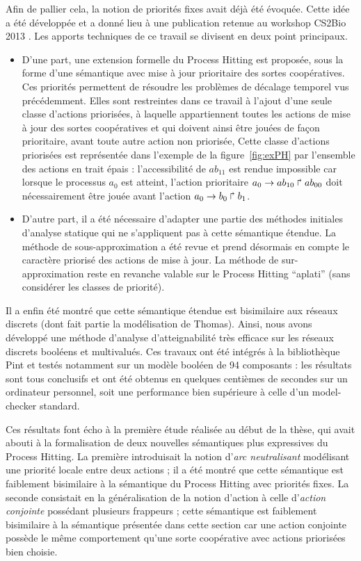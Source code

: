Afin de pallier cela, la notion de priorités fixes avait déjà été évoquée.
Cette idée a été développée et a donné lieu à une publication retenue au workshop CS2Bio 2013 \cite{FPMR13-CS3Bio}.
Les apports techniques de ce travail se divisent en deux point principaux.
\begin{itemize}
  \item D'une part, une extension formelle du Process Hitting est proposée, sous la forme d'une sémantique avec mise à jour prioritaire des sortes coopératives.
  Ces priorités permettent de résoudre les problèmes de décalage temporel vus précédemment.
  Elles sont restreintes dans ce travail à l'ajout d'une seule classe d'actions priorisées, à laquelle appartiennent toutes les actions de mise à jour des sortes coopératives et qui doivent ainsi être jouées de façon prioritaire, avant toute autre action non priorisée,
  Cette classe d'actions priorisées est représentée dans l'exemple de la figure~\ref{fig:exPH} par l'ensemble des actions en trait épais :
  l'accessibilité de $ab_{11}$ est rendue impossible car lorsque le processus $a_0$ est atteint, l'action prioritaire $a_0\rightarrow ab_{10}\Rsh ab_{00}$ doit nécessairement être jouée avant l'action $a_0\rightarrow b_0\Rsh b_1$.
  \item D'autre part, il a été nécessaire d'adapter une partie des méthodes initiales d'analyse statique qui ne s'appliquent pas à cette sémantique étendue.
  La méthode de sous-approximation a été revue et prend désormais en compte le caractère priorisé des actions de mise à jour.
  La méthode de sur-approximation reste en revanche valable sur le Process Hitting “aplati” (\ie sans considérer les classes de priorité).
\end{itemize}
Il a enfin été montré que cette sémantique étendue est bisimilaire aux réseaux discrets (dont fait partie la modélisation de Thomas).
Ainsi, nous avons développé une méthode d'analyse d'atteignabilité très efficace sur les réseaux discrets booléens et multivalués.
Ces travaux ont été intégrés à la bibliothèque Pint et testés notamment sur un modèle booléen de 94 composants :
les résultats sont tous conclusifs et ont été obtenus en quelques centièmes de secondes sur un ordinateur personnel,
soit une performance bien supérieure à celle d'un model-checker standard.

Ces résultats font écho à la première étude réalisée au début de la thèse, qui avait abouti à la formalisation de deux nouvelles sémantiques plus expressives du Process Hitting.
La première introduisait la notion d'\emph{arc neutralisant} modélisant une priorité locale entre deux actions ;
il a été montré que cette sémantique est faiblement bisimilaire à la sémantique du Process Hitting avec priorités fixes.
La seconde consistait en la généralisation de la notion d'action à celle d'\emph{action conjointe} possédant plusieurs frappeurs ;
cette sémantique est faiblement bisimilaire à la sémantique présentée dans cette section car une action conjointe possède le même comportement qu'une sorte coopérative avec actions priorisées bien choisie.



